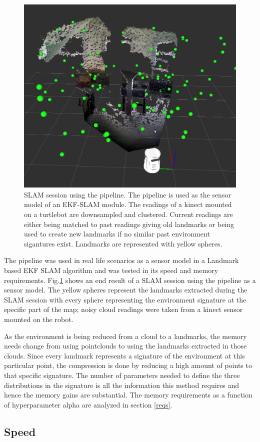 \documentclass[twoside,hidelinks]{article}
\begin{document}
\begin{figure}
  \centering
    \includegraphics[width=.5\textwidth]{SLAM110landmarks2}
    \caption{SLAM session using the pipeline. The pipeline is used as the sensor model of an EKF-SLAM module. The readings of a kinect mounted on a turtlebot are downsampled and clustered. Current readings are either being matched to past readings giving old landmarks or being used to create new landmarks if no similar past environment sigantures exist. Landmarks are represented with yellow spheres. }
  \label{SLAM}
\end{figure}


The pipeline was used in real life scenarios as a sensor model in a Landmark based EKF SLAM algorithm and was tested in its speed and memory requirements. Fig.\ref{SLAM} shows an end result of a SLAM session using the pipeline as a sensor model. The yellow spheres represent the landmarks extracted during the SLAM session with every sphere representing the environment signature at the specific part of the map; noisy cloud readings were taken from a kinect sensor mounted on the robot.


As the environment is being reduced from a cloud to a landmarks, the memory needs change from using pointclouds to using the landmarks extracted in those clouds. Since every landmark represents a signature of the environment at this particular point, the compression is done by reducing a high amount of points to that specific signature. The number of parameters needed to define the three distributions in the signature is all the information this method requires and hence the memory gains are substantial. The memory requirements as a function of hyperparameter alpha are analyzed in section \ref{reqs}. 

\subsection{Speed}
\end{document}
